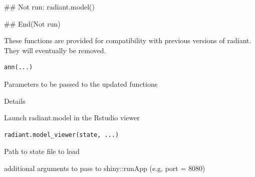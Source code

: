 \documentclass[a4paper]{book}
\begin{document}
%
\begin{Examples}
\begin{ExampleCode}
## Not run: 
radiant.model()

## End(Not run)
\end{ExampleCode}
\end{Examples}
%
\begin{Description}
These functions are provided for compatibility with previous versions of
radiant. They will eventually be  removed.
\end{Description}
%
\begin{Usage}
\begin{verbatim}
ann(...)
\end{verbatim}
\end{Usage}
%
\begin{Arguments}
\begin{ldescription}
\item[\code{...}] Parameters to be passed to the updated functions
\end{ldescription}
\end{Arguments}
%
\begin{Section}{Details}


\end{Section}
%
\begin{Description}
Launch radiant.model in the Rstudio viewer
\end{Description}
%
\begin{Usage}
\begin{verbatim}
radiant.model_viewer(state, ...)
\end{verbatim}
\end{Usage}
%
\begin{Arguments}
\begin{ldescription}
\item[\code{state}] Path to state file to load

\item[\code{...}] additional arguments to pass to shiny::runApp (e.g, port = 8080)
\end{ldescription}
\end{Arguments}
\end{document}
